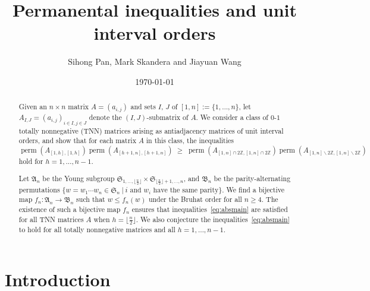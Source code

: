 \documentclass[12pt]{amsart}
\theoremstyle{definition}
\numberwithin{equation}{section}
\begin{document}
\author{Sihong Pan, Mark Skandera and Jiayuan Wang}
\address{Department of Mathematics, Lehigh University,
Bethlehem, PA 18015, USA}

\title{Permanental inequalities and unit interval orders}



\date{\today}

\begin{abstract}
  Given an $n \times n$ matrix $A = (a_{i,j})$ and
  sets $I$, $J$ of $[1,n] := \{1,\dotsc,n\}$,
  let $A_{I,J} = (a_{i,j})_{i\in I, j \in J}$ denote the $(I, J)$-submatrix of $A$.
  We consider a class of $0$-$1$ totally nonnegative (TNN) matrices arising
  as antiadjacency matrices of unit interval orders, and show that for each
  matrix $A$ in this class,
  the inequalities
  \begin{equation}
    \operatorname{perm}(A_{[1,h],[1,h]}) \operatorname{perm}(A_{[h+1,n],[h+1,n]}) \;\geq\;
  \operatorname{perm}(A_{[1,n] \cap 2\mathbb Z, [1,n] \cap 2\mathbb Z})
    \operatorname{perm}(A_{[1,n] \smallsetminus 2\mathbb Z, [1,n] \smallsetminus 2\mathbb Z})\tag{$*$} \label{eq:absmain}
  \end{equation}
  hold for $h = 1,\dotsc, n-1$.

   Let $\mathfrak A_n$ be the Young subgroup $\mathfrak{S}_{1, \dotsc, \lfloor\frac{n}{2}\rfloor}\times \mathfrak{S}_{\lfloor\frac{n}{2}\rfloor +1, \dotsc, n}$, and $\mathfrak B_n$ be the parity-alternating permutations $\{w = w_1\cdots w_n \in \mathfrak{S}_n \ | \ \text{$i$ and $w_i$ have the same parity} \}$. We find a bijective map $f_n: \mathfrak A_n \rightarrow \mathfrak B_n$ such that $w \leq f_n(w)$ under the Bruhat order
   for all $n\geq 4$. The existence of such a bijective map $f_n$ ensures that inequalities~\eqref{eq:absmain} are satisfied for all TNN matrices $A$ when $h=\lfloor\frac{n}{2}\rfloor$.
  We also conjecture the inequalities~\eqref{eq:absmain} to hold for all totally nonnegative matrices and all $h = 1, \dotsc ,n-1$.
\end{abstract}

\maketitle

\section{Introduction}\label{s:intro}
\end{document}
